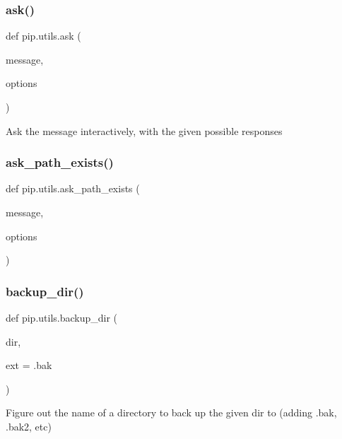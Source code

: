 \subsubsection{\texorpdfstring{ask()}{ask()}}
{\footnotesize\ttfamily def pip.\+utils.\+ask (\begin{DoxyParamCaption}\item[{}]{message,  }\item[{}]{options }\end{DoxyParamCaption})}

\begin{DoxyVerb}Ask the message interactively, with the given possible responses\end{DoxyVerb}
 \mbox{\label{namespacepip_1_1utils_ab5791ec726e698bd0bb2332407908937}} 
\subsubsection{\texorpdfstring{ask\+\_\+path\+\_\+exists()}{ask\_path\_exists()}}
{\footnotesize\ttfamily def pip.\+utils.\+ask\+\_\+path\+\_\+exists (\begin{DoxyParamCaption}\item[{}]{message,  }\item[{}]{options }\end{DoxyParamCaption})}

\mbox{\label{namespacepip_1_1utils_a03132151652bc45f9dbdb97fcf954141}} 
\subsubsection{\texorpdfstring{backup\+\_\+dir()}{backup\_dir()}}
{\footnotesize\ttfamily def pip.\+utils.\+backup\+\_\+dir (\begin{DoxyParamCaption}\item[{}]{dir,  }\item[{}]{ext = {\ttfamily \textquotesingle{}.bak\textquotesingle{}} }\end{DoxyParamCaption})}

\begin{DoxyVerb}Figure out the name of a directory to back up the given dir to
(adding .bak, .bak2, etc)\end{DoxyVerb}
 \mbox{\label{namespacepip_1_1utils_a381bc654b1f5628e0c32cf6011d18e9a}} 
